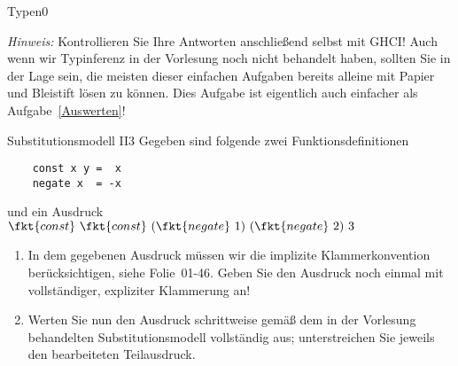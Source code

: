 \documentclass[11pt]{article}
\begin{document}
\begin{hausaufgabe}[keine]{Typen}{0}
\begin{enumerate}
\end{enumerate}
\emph{Hinweis:}
Kontrollieren Sie Ihre Antworten anschließend selbst mit GHCI!
Auch wenn wir Typinferenz in der Vorlesung noch nicht
behandelt haben, sollten Sie in der Lage sein,
die meisten dieser einfachen Aufgaben bereits
alleine mit Papier und Bleistift lösen zu können.
Dies Aufgabe ist eigentlich auch einfacher als Aufgabe~\ref{Auswerten}!
\end{hausaufgabe}


\begin{hausaufgabe}[PDF]{Substitutionsmodell II}{3}\label{Substitutionsmodell2}%
  Gegeben sind folgende zwei Funktionsdefinitionen
  \begin{verbatim}
    const x y =  x
    negate x  = -x
  \end{verbatim}
  \vspace*{-3EX}
  und ein Ausdruck
  $\fkt{const}\ \fkt{const}\ (\fkt{negate}\ 1)\ (\fkt{negate}\ 2)\ 3$
 \begin{enumerate}
  \item In dem gegebenen Ausdruck müssen wir die implizite Klammerkonvention berücksichtigen,
        siehe Folie~01-46.
        Geben Sie den Ausdruck noch einmal mit vollständiger, expliziter Klammerung an!
         
        
  \item Werten Sie nun den Ausdruck schrittweise gemäß dem in der Vorlesung behandelten Substitutionsmodell
        vollständig aus; unterstreichen Sie jeweils den bearbeiteten Teilausdruck.
  

\end{enumerate}
\end{hausaufgabe}
\end{document}
